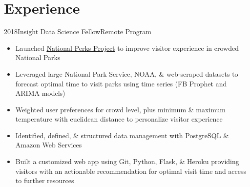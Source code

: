 \documentclass[letterpaper]{twentysecondcv} %
\begin{document}
\section{Experience}
\begin{twenty}
\twentyitem
    	{2018}{}{Insight Data Science Fellow}{Remote Program}
        	{}
        { \vspace{-1mm}
        {\begin{itemize}
        \item Launched  \textcolor{special}{\href{http://www.nationalperks.fun}{National Perks Project}} to improve visitor experience in crowded National Parks
        		\vspace{1mm} 
        \item Leveraged large National Park Service, NOAA, \& web-scraped datasets to forecast optimal time to visit parks using time series (FB Prophet and ARIMA models)
        	        \vspace{1mm} 
        \item Weighted user preferences for crowd level, plus minimum \& maximum temperature with euclidean distance to personalize visitor experience
        		\vspace{1mm} 
        \item Identified, defined, \& structured data management with PostgreSQL \& Amazon Web Services
                \vspace{1mm} 
        \item Built a customized web app using Git, Python, Flask, \& Heroku providing visitors with an actionable recommendation for optimal visit time and access to further resources 
    \end{itemize}}  \vspace{6mm} } 
    

\end{twenty}
\end{document}
